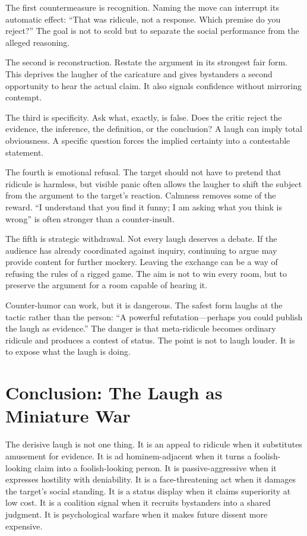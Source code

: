 ﻿\documentclass[12pt,a4paper]{book}
\begin{document}
The first countermeasure is recognition. Naming the move can interrupt its automatic effect: ``That was ridicule, not a response. Which premise do you reject?'' The goal is not to scold but to separate the social performance from the alleged reasoning.

The second is reconstruction. Restate the argument in its strongest fair form. This deprives the laugher of the caricature and gives bystanders a second opportunity to hear the actual claim. It also signals confidence without mirroring contempt.

The third is specificity. Ask what, exactly, is false. Does the critic reject the evidence, the inference, the definition, or the conclusion? A laugh can imply total obviousness. A specific question forces the implied certainty into a contestable statement.

The fourth is emotional refusal. The target should not have to pretend that ridicule is harmless, but visible panic often allows the laugher to shift the subject from the argument to the target's reaction. Calmness removes some of the reward. ``I understand that you find it funny; I am asking what you think is wrong'' is often stronger than a counter-insult.

The fifth is strategic withdrawal. Not every laugh deserves a debate. If the audience has already coordinated against inquiry, continuing to argue may provide content for further mockery. Leaving the exchange can be a way of refusing the rules of a rigged game. The aim is not to win every room, but to preserve the argument for a room capable of hearing it.

Counter-humor can work, but it is dangerous. The safest form laughs at the tactic rather than the person: ``A powerful refutation---perhaps you could publish the laugh as evidence.'' The danger is that meta-ridicule becomes ordinary ridicule and produces a contest of status. The point is not to laugh louder. It is to expose what the laugh is doing.

\section{Conclusion: The Laugh as Miniature War}

The derisive laugh is not one thing. It is an appeal to ridicule when it substitutes amusement for evidence. It is ad hominem-adjacent when it turns a foolish-looking claim into a foolish-looking person. It is passive-aggressive when it expresses hostility with deniability. It is a face-threatening act when it damages the target's social standing. It is a status display when it claims superiority at low cost. It is a coalition signal when it recruits bystanders into a shared judgment. It is psychological warfare when it makes future dissent more expensive.
\end{document}
